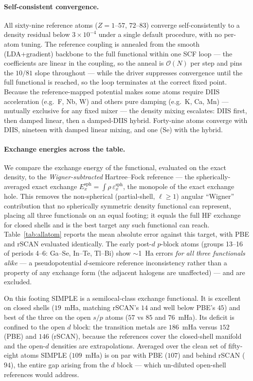 \documentclass[aps,prb,reprint,superscriptaddress,nofootinbib]{revtex4-2}
\begin{document}
\paragraph*{Self-consistent convergence.} All sixty-nine reference atoms ($Z=1$--$57$, $72$--$83$)
converge self-consistently to a density residual below $3\times10^{-4}$ under a single default procedure,
with no per-atom tuning. The reference coupling is annealed from the smooth (LDA+gradient) backbone to
the full functional within one SCF loop --- the coefficients are linear in the coupling, so the anneal is
$\mathcal{O}(N)$ per step and pins the $10/81$ slope throughout --- while the driver suppresses
convergence until the full functional is reached, so the loop terminates at the correct fixed point.
Because the reference-mapped potential makes some atoms require DIIS acceleration (e.g.\ F, Nb, W) and
others pure damping (e.g.\ K, Ca, Mn) --- mutually exclusive for any fixed mixer --- the density mixing
escalates: DIIS first, then damped linear, then a damped-DIIS hybrid. Forty-nine atoms converge with
DIIS, nineteen with damped linear mixing, and one (Se) with the hybrid.

\paragraph*{Exchange energies across the table.} We compare the exchange energy of the functional,
evaluated on the exact density, to the \emph{Wigner-subtracted} Hartree--Fock reference --- the spherically-averaged exact
exchange $E_x^{\mathrm{sph}}=\int\rho\,\varepsilon_x^{\mathrm{sph}}$, the monopole of the exact exchange
hole. This removes the non-spherical (partial-shell, $\ell\ge1$) angular ``Wigner'' contribution that no
spherically symmetric density functional can represent, placing all three functionals on an equal
footing; it equals the full HF exchange for closed shells and is the best target any such functional can
reach. Table~\ref{tab:allatom} reports the mean absolute error against this target, with PBE and rSCAN
evaluated identically. The early post-$d$ $p$-block atoms (groups 13--16 of periods 4--6: Ga--Se, In--Te,
Tl--Bi) show $\sim$1~Ha errors \emph{for all three functionals alike} --- a pseudopotential $d$-semicore
reference inconsistency rather than a property of any exchange form (the adjacent halogens are
unaffected) --- and are excluded.

On this footing SIMPLE is a semilocal-class exchange functional. It is excellent on closed shells
($19$~mHa, matching rSCAN's $14$ and well below PBE's $45$) and best of the three on the open $s/p$ atoms
($57$ vs $85$ and $76$~mHa). Its deficit is confined to the open $d$ block: the transition metals are
$186$~mHa versus $152$ (PBE) and $146$ (rSCAN), because the references cover the closed-shell manifold and
the open-$d$ densities are extrapolations. Averaged over the clean set of fifty-eight atoms SIMPLE
($109$~mHa) is on par with PBE ($107$) and behind rSCAN ($94$), the entire gap arising from the $d$
block --- which un-diluted open-shell references would address.
\end{document}
